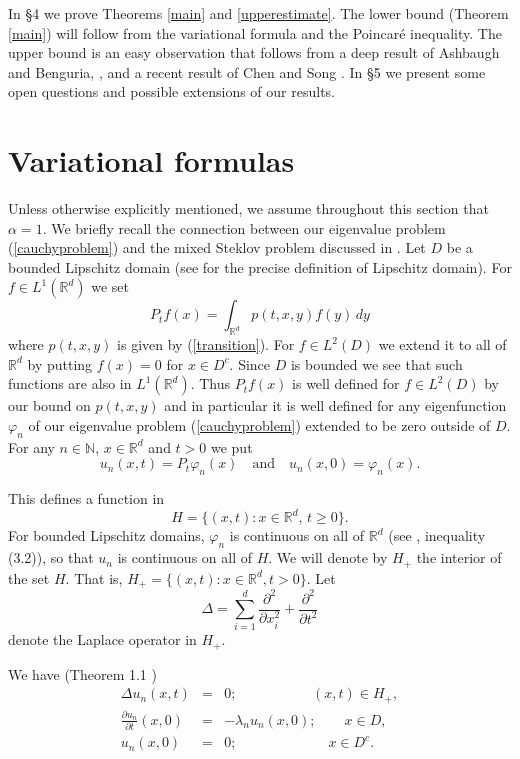 \documentclass[11pt,leqno]{article}
\theoremstyle{definition}
\newcommand{\Rd}{\mathbb{R}^d}
\newcommand{\N}{\mathbb{N}}
\numberwithin{equation}{section}
\begin{document}
In \S4 we prove  Theorems \ref{main} and \ref{upperestimate}. The lower bound (Theorem \ref{main})  will follow from the variational formula and the Poincar\'e inequality.  The upper bound is an easy observation
that follows from a deep result of Ashbaugh and Benguria, \cite{AB2},  and a recent result
of Chen and Song
\cite{CS3}. In \S5 we present some open questions and possible extensions of our results.




\section{Variational formulas}

Unless otherwise explicitly mentioned, we assume throughout this section that 
$\alpha = 1$. 
We briefly recall the connection  between our eigenvalue problem
(\ref{cauchyproblem})  and the mixed Steklov problem discussed in \cite{BK}. Let $D$
be a bounded Lipschitz domain (see \cite{BK} for the precise definition of Lipschitz domain). 
  For
$f
\in L^{1}(\Rd)$ we set
$$P_{t}f(x) = \int_{\Rd} p(t,x,y) f(y) \, dy$$
    where $p(t,x,y)$ is given by (\ref{transition}).
For  $f\in L^{2}(D)$ we extend it to  all of  $\Rd$ by putting $f(x) 
= 0$ for $x
\in
D^{c}$.  Since  $D$ is bounded we see  that such functions are also in
$ L^{1}(\Rd)$.   Thus
$P_{t}f(x)$ is well defined for $f \in L^{2}(D)$ by our bound on $p(t,x,y)$ and
  in particular it is well
defined   for any eigenfunction
$\varphi_n$ of our eigenvalue
problem (\ref{cauchyproblem})  extended to be zero outside of $D$.   
For any $n \in \N$, $x \in \Rd$ and $t > 0$ we put
\begin{equation}
\label{un}
u_{n}(x,t) = P_{t}\varphi_{n}(x) \quad \text{and} \quad u_{n}(x,0) = 
\varphi_{n}(x).
\end{equation}

This defines a function in $$H=\{(x, t):x\in
\Rd, \, t\geq 0\}.$$  
For  bounded Lipschitz domains,  
$\varphi_{n}$ 
is continuous on all of  $\Rd$ (see \cite{BK}, inequality (3.2)), so that $u_{n}$ is 
continuous on all of  $H$.
We will denote by  $H_{+}$ the interior of the set $H$.
  That is, $H_{+}=
\{(x,t): x \in\Rd, t >0\}.$
Let
$$
\Delta = \sum_{i = 1}^{d} \frac{\partial^{2}}{\partial
x_{i}^{2}} + \frac{\partial^{2}}{\partial t^{2}}
$$
denote the Laplace
operator in
$H_{+}$.

We have (Theorem 1.1 \cite{BK})
\begin{eqnarray}
\Delta u_{n}(x,t) & = & 0;
\quad \quad \quad \quad \, \,  \quad (x,t) \in H_{+},
\label{fsteklov1}\\
\frac{\partial u_{n}}{\partial t} (x,0)  & = & - \lambda_{n} u_{n}(x,0);
\quad  \quad x \in  D,
\label{fsteklov2}\\
u_{n}(x,0)  & = & 0;
\quad \quad \quad \quad \quad \, \, \, \quad x \in D^{c}.
\label{fsteklov3}
\end{eqnarray}
\end{document}
